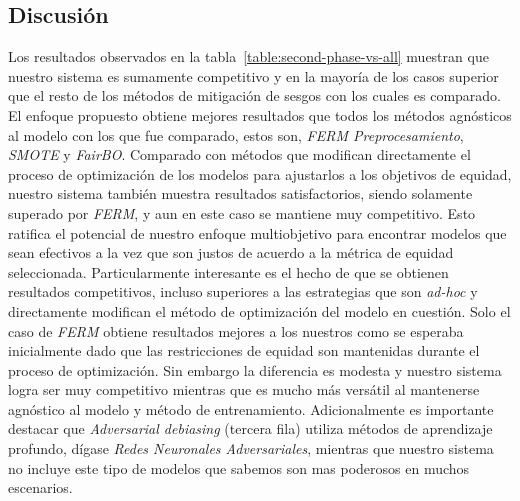 

\subsection{Discusión}\label{section:discussion-second-phase}

Los resultados observados en la tabla~\ref{table:second-phase-vs-all} muestran que nuestro sistema es sumamente competitivo y en la mayoría de los casos superior que el resto de los métodos de mitigación de sesgos con los cuales es comparado.
El enfoque propuesto obtiene mejores resultados que todos los métodos agnósticos al modelo con los que fue comparado, estos son, \emph{FERM Preprocesamiento}, \emph{SMOTE} y \emph{FairBO}.
Comparado con métodos que modifican directamente el proceso de optimización de los modelos para ajustarlos a los objetivos de equidad, nuestro sistema también muestra resultados satisfactorios, siendo solamente superado por \emph{FERM}, y aun en este caso se mantiene muy competitivo.
Esto ratifica el potencial de nuestro enfoque multiobjetivo para encontrar modelos que sean efectivos a la vez que son justos de acuerdo a la métrica de equidad seleccionada.
Particularmente interesante es el hecho de que se obtienen resultados competitivos, incluso superiores a las estrategias que son \emph{ad-hoc} y directamente modifican el método de optimización del modelo en cuestión.
Solo el caso de \emph{FERM} obtiene resultados mejores a los nuestros como se esperaba inicialmente dado que las restricciones de equidad son mantenidas durante el proceso de optimización.
Sin embargo la diferencia es modesta y nuestro sistema logra ser muy competitivo mientras que es mucho más versátil al mantenerse agnóstico al modelo y método de entrenamiento.
Adicionalmente es importante destacar que \emph{Adversarial debiasing} (tercera fila) utiliza métodos de aprendizaje profundo, dígase \emph{Redes Neuronales Adversariales}, mientras que nuestro sistema no incluye este tipo de modelos que sabemos son mas poderosos en muchos escenarios.

